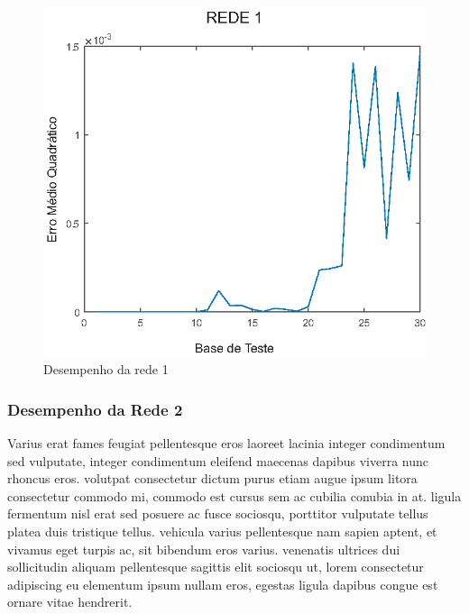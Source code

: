 \begin{figure}[h!]

\centering %
\includegraphics{04-Figuras/MSE_DesempenhoNet1}

\caption{Desempenho da rede 1}

\label{figura:rede1}

\end{figure}

\subsubsection{Desempenho da Rede 2}

Varius erat fames feugiat pellentesque eros laoreet lacinia integer condimentum sed vulputate, integer condimentum eleifend maecenas dapibus viverra nunc rhoncus eros. volutpat consectetur dictum purus etiam augue ipsum litora consectetur commodo mi, commodo est cursus sem ac cubilia conubia in at. ligula fermentum nisl erat sed posuere ac fusce sociosqu, porttitor vulputate tellus platea duis tristique tellus. vehicula varius pellentesque nam sapien aptent, et vivamus eget turpis ac, sit bibendum eros varius. venenatis ultrices dui sollicitudin aliquam pellentesque sagittis elit sociosqu ut, lorem consectetur adipiscing eu elementum ipsum nullam eros, egestas ligula dapibus congue est ornare vitae hendrerit.

